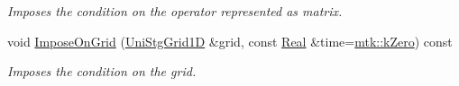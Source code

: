 \begin{DoxyCompactItemize}
\begin{DoxyCompactList}\small\item\em Imposes the condition on the operator represented as matrix. \end{DoxyCompactList}\item 
void \hyperlink{classmtk_1_1RobinBCDescriptor1D_ab0daec1d6c5c9c6768bea08281a3831d}{Impose\+On\+Grid} (\hyperlink{classmtk_1_1UniStgGrid1D}{Uni\+Stg\+Grid1\+D} \&grid, const \hyperlink{group__c01-roots_gac080bbbf5cbb5502c9f00405f894857d}{Real} \&time=\hyperlink{group__c01-roots_ga59a451a5fae30d59649bcda274fea271}{mtk\+::k\+Zero}) const 
\begin{DoxyCompactList}\small\item\em Imposes the condition on the grid. \end{DoxyCompactList}\end{DoxyCompactItemize}
